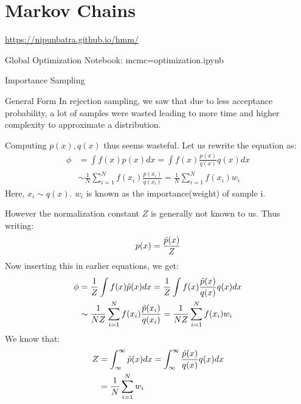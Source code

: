\documentclass{beamer}
\begin{document}
\section{Markov Chains}
\begin{frame}
    \url{https://nipunbatra.github.io/hmm/}
\end{frame}

\begin{frame}{Global Optimization}
    Notebook: mcmc=optimization.ipynb
    
\end{frame}


\begin{section}{Importance Sampling}
    \begin{frame}{General Form}
        In rejection sampling, we saw that due to less acceptance probability, a lot of samples were wasted leading to more time and higher complexity to approximate a distribution.

        Computing $p(x), q(x)$ thus seems wasteful. Let us rewrite the equation as:
        \begin{align*}
            \phi &= \int f(x)p(x)dx = \int f(x)\frac{p(x)}{q(x)}q(x)dx \\
            &\sim \frac{1}{N} \sum_{i=1}^Nf(x_i)\frac{p(x_i)}{q(x_i)} = \frac{1}{N} \sum_{i=1}^Nf(x_i)w_i 
        \end{align*}
        Here, $x_i\sim q(x)$. $w_i$ is known as the importance(weight) of sample i. 
    \end{frame}

    \begin{frame}
        However the normalization constant $Z$ is generally not known to us. Thus writing: 
        \begin{equation}
            p(x) = \frac{\Tilde{p}(x)}{Z}
        \end{equation}
        Now inserting this in earlier equations, we get:
        \begin{align*}
            \phi &=\frac{1}{Z} \int f(x)\Tilde{p}(x)dx = \frac{1}{Z}\int f(x)\frac{\Tilde{p}(x)}{q(x)}q(x)dx \\
            &\sim \frac{1}{NZ} \sum_{i=1}^Nf(x_i)\frac{\Tilde{p}(x_i)}{q(x_i)} = \frac{1}{NZ} \sum_{i=1}^Nf(x_i)w_i 
        \end{align*}
        We know that:
        \begin{align*}
            Z &= \int_{\infty}^{\infty} \Tilde{p}(x)dx = \int_{\infty}^{\infty}\frac{\Tilde{p}(x)}{q(x)}q(x)dx \\
            &= \frac{1}{N}\sum_{i=1}^N w_i
        \end{align*}
    \end{frame}


\end{section}
\end{document}
